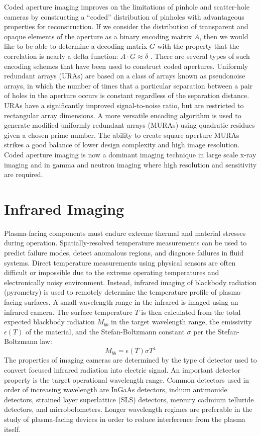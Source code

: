 \documentclass{jpp}
\begin{document}
Coded aperture imaging improves on the limitations of pinhole and scatter-hole cameras by constructing a ``coded'' distribution of pinholes with advantageous properties for reconstruction. If we consider the distribution of transparent and opaque elements of the aperture as a binary encoding matrix $A$, then we would like to be able to determine a decoding matrix $G$ with the property that the correlation is nearly a delta function: $A \cdot G \approx \delta$ \citep{CIESLAK201659}. There are several types of such encoding schemes that have been used to construct coded apertures. Uniformly redundant arrays (URAs) are based on a class of arrays known as pseudonoise arrays, in which the number of times that a particular separation between a pair of holes in the aperture occurs is constant regardless of the separation distance. URAs have a significantly improved signal-to-noise ratio, but are restricted to rectangular array dimensions. A more versatile encoding algorithm is used to generate modified uniformly redundant arrays (MURAs) using quadratic residues given a chosen prime number. The ability to create square aperture MURAs strikes a good balance of lower design complexity and high image resolution. Coded aperture imaging is now a dominant imaging technique in large scale x-ray imaging and in gamma and neutron imaging where high resolution and sensitivity are required.

\section{Infrared Imaging}

Plasma-facing components must endure extreme thermal and material stresses during operation. Spatially-resolved temperature measurements can be used to predict failure modes, detect anomalous regions, and diagnose failures in fluid systems. Direct temperature measurements using physical sensors are often difficult or impossible due to the extreme operating temperatures and electronically noisy environment. Instead, infrared imaging of blackbody radiation (pyrometry) is used to remotely determine the temperature profile of plasma-facing surfaces. A small wavelength range in the infrared is imaged using an infrared camera. The surface temperature $T$ is then calculated from the total expected blackbody radiation $M_{bb}$ in the target wavelength range, the emissivity $\epsilon(T)$ of the material, and the Stefan-Boltzmann constant $\sigma$ per the Stefan-Boltzmann law:
\begin{equation*}
M_{bb} = \epsilon(T) \sigma T^4
\end{equation*}
The properties of imaging cameras are determined by the type of detector used to convert focused infrared radiation into electric signal. An important detector property is the target operational wavelength range. Common detectors used in order of increasing wavelength are InGaAs detectors, indium antimonide detectors, strained layer superlattice (SLS) detectors, mercury cadmium telluride detectors, and microbolometers. Longer wavelength regimes are preferable in the study of plasma-facing devices in order to reduce interference from the plasma itself.
\end{document}
